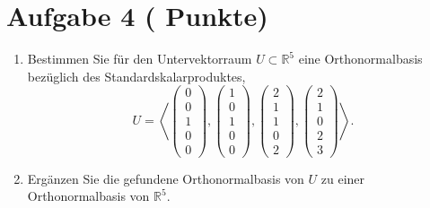 \documentclass[11pt, a4paper]{article}
\newcommand{\aufgabe}[2]{%
  \section*{\Large\bfseries Aufgabe #1%
  \if\relax\detokenize{#2}\relax\else \hfill\normalfont\normalsize(#2 Punkte)\fi}%
  \vspace{-1.5ex}
}
\begin{document}
\aufgabe{4}{}
\begin{enumerate}
  \item Bestimmen Sie für den Untervektorraum $U\subset\mathbb{R}^5$ eine Orthonormalbasis bezüglich des Standardskalarproduktes,
  \[
    U=\left\langle
    \begin{pmatrix}0\\0\\1\\0\\0\end{pmatrix},
    \begin{pmatrix}1\\0\\1\\0\\0\end{pmatrix},
    \begin{pmatrix}2\\1\\1\\0\\2\end{pmatrix},
    \begin{pmatrix}2\\1\\0\\2\\3\end{pmatrix}
    \right\rangle .
  \]
  \begin{framed}\end{framed}

  \item Ergänzen Sie die gefundene Orthonormalbasis von $U$ zu einer Orthonormalbasis von $\mathbb{R}^5$.
  \begin{framed}\end{framed}
\end{enumerate}
\end{document}
